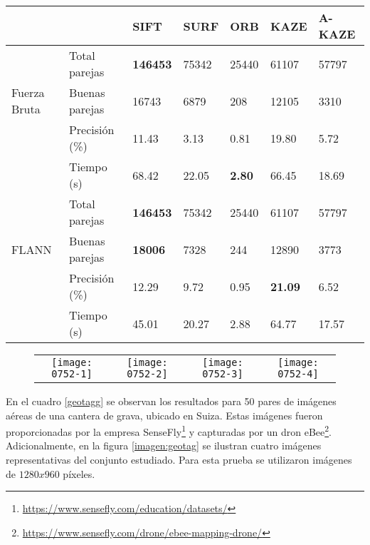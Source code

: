 \begin{table}[h]
	\centering
	\label{0752-2}
	\renewcommand{\arraystretch}{0.8}%
	\begin{tabular}{@{}lllllll@{}}
		\toprule
		&                      				& SIFT 			& SURF & ORB 		& KAZE 				& A-KAZE  \\ \midrule 
		\hfill\vline& Total parejas  &\textbf{146453}		& 75342&25440		&61107 				& 57797   \\
		Fuerza Bruta \vline& Buenas parejas & 16743			& 6879 & 208 		& 12105 			& 3310    \\
		\hfill\vline& Precisión (\%) & 11.43				&3.13  &0.81		& 19.80 			& 5.72  \\
		\vspace{0.3cm}
		\hfill\vline& Tiempo (s)     & 68.42				&22.05 & \textbf{2.80} &66.45       & 18.69   \\
		
		\hfill\vline& Total parejas  &\textbf{146453}& 75342&25440			&61107 				& 57797   \\
		FLANN  \hfill\vline& Buenas parejas &\textbf{18006} & 7328 & 244 			& 12890 			& 3773    \\
		\hfill\vline& Precisión (\%) & 12.29				& 9.72 &0.95  			& \textbf{21.09} 	& 6.52    \\ 
		\hfill\vline& Tiempo (s)     & 45.01				& 20.27& 2.88			& 64.77				& 17.57   \\ 
		\bottomrule
	\end{tabular}
\end{table}

\begin{figure}[h]
	\centering
	\vspace{0.6cm}
	\begin{tabular}{@{}cccc@{}}
		\texttt{[image: 0752-1]} &
		\texttt{[image: 0752-2]} &
		\texttt{[image: 0752-3]} &
		\texttt{[image: 0752-4]} 
	\end{tabular}
	\label{imagen:0752}
\end{figure}

En el cuadro \ref{geotagg} se observan los resultados para 50 pares de imágenes aéreas de una cantera de grava, ubicado en Suiza. Estas imágenes fueron proporcionadas por la empresa SenseFly\footnote{\url{https://www.sensefly.com/education/datasets/}} y capturadas por un dron eBee\footnote{\url{https://www.sensefly.com/drone/ebee-mapping-drone/}}.  Adicionalmente, en la figura \ref{imagen:geotag} se ilustran cuatro imágenes representativas del conjunto estudiado. Para esta prueba se utilizaron imágenes de $1280x960$ píxeles.

